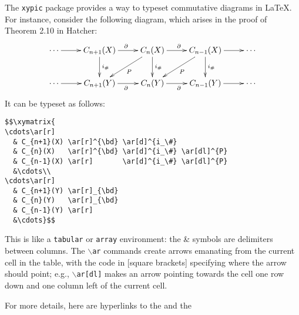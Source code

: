 The \texttt{xypic} package provides a way to typeset commutative diagrams
in LaTeX.  For instance, consider the following
diagram, which arises in the proof of Theorem 2.10 in Hatcher:
$$
\xymatrix{
\cdots\ar[r] & C_{n+1}(X) \ar[r]^{\bd}\ar[d]^{i_\#} & C_{n}(X) \ar[r]^{\bd} \ar[d]^{i_\#} \ar[dl]^{P} & C_{n-1}(X) \ar[r] \ar[d]^{i_\#} \ar[dl]^{P} &\cdots\\
\cdots\ar[r] & C_{n+1}(Y) \ar[r]_{\bd} & C_{n}(Y) \ar[r]_{\bd} & C_{n-1}(Y)\ar[r] &\cdots\\
}$$
It can be typeset as follows:
\begin{verbatim}
$$\xymatrix{
\cdots\ar[r]
  & C_{n+1}(X) \ar[r]^{\bd} \ar[d]^{i_\#}
  & C_{n}(X)   \ar[r]^{\bd} \ar[d]^{i_\#} \ar[dl]^{P}
  & C_{n-1}(X) \ar[r]       \ar[d]^{i_\#} \ar[dl]^{P}
  &\cdots\\
\cdots\ar[r]
  & C_{n+1}(Y) \ar[r]_{\bd}
  & C_{n}(Y)   \ar[r]_{\bd}
  & C_{n-1}(Y) \ar[r]
  &\cdots}$$
\end{verbatim}
This is like a \texttt{tabular} or \texttt{array} environment:
the \& symbols are delimiters between columns.  The $\backslash$\texttt{ar}
commands create arrows emanating from the current cell in the table, with
the code in [square brackets] specifying where the arrow should point;
e.g., \texttt{$\backslash$ar[dl]} makes an arrow pointing towards the
cell one row down and one column left of the current cell.

For more details, here are hyperlinks to the  and the 


